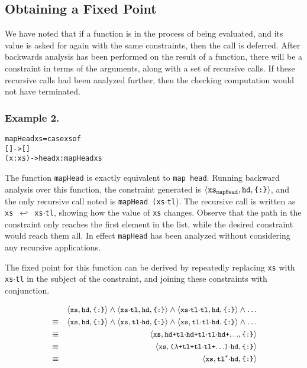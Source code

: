 \documentclass[book]{tfp05symp}
\newcommand{\T}[1]{\texttt{#1}}
\newcommand{\tup}[1]{\ensuremath{\langle #1 \rangle}}
\renewcommand{\c}[3]{\tup{\T{#1},\T{#2},\T{\{#3\}}}}
\newcommand{\s}[1]{\ensuremath{_{\tt #1}}}
\newcommand{\K}{\ensuremath{^\ast}}
\newcommand{\D}{\ensuremath{\cdot}}
\newcommand{\mapsfrom}{\hookleftarrow}
\newcounter{exmp}
\newcommand{\yesexample}{\subsubsection*{Example 2.\arabic{exmp}}\addtocounter{exmp}{1}}
\newenvironment{code}{\begin{alltt}\small}{\end{alltt}}
\begin{document}
\subsection{Obtaining a Fixed Point}
\label{sec:fixed_point}

We have noted that if a function is in the process of being
evaluated, and its value is asked for again with the same
constraints, then the call is deferred. After backwards analysis has
been performed on the result of a function, there will be a
constraint in terms of the arguments, along with a set of recursive
calls. If these recursive calls had been analyzed further, then the
checking computation would not have terminated.

\yesexample

\begin{code}
mapHead xs = case xs of
                  []     -> []
                  (x:xs) -> head x : mapHead xs
\end{code}

The function \T{mapHead} is exactly equivalent to \T{map head}.
Running backward analysis over this function, the constraint
generated is \c{xs\s{mapHead}}{hd}{:}, and the only recursive call
noted is \T{mapHead (xs\D{}tl}). The recursive call is written as
\T{xs $\mapsfrom$ xs\D{}tl}, showing how the value of \T{xs}
changes. Observe that the path in the constraint only reaches the
first element in the list, while the desired constraint would reach
them all. In effect \T{mapHead} has been analyzed without
considering any recursive applications.

The fixed point for this function can be derived by repeatedly
replacing \T{xs} with \T{xs\D{}tl} in the subject of the constraint,
and joining these constraints with conjunction.

\setcounter{equation}{0}
\renewcommand\theequation{\arabic{equation}}
\begin{eqnarray}
&& \small{\c{xs}{hd}{:} \wedge \c{xs\D{}tl}{hd}{:} \wedge
   \c{xs\D{}tl\D{}tl}{hd}{:} \wedge \ldots} \\
& \equiv & \small{\c{xs}{hd}{:} \wedge \c{xs}{tl\D{}hd}{:} \wedge
   \c{xs}{tl\D{}tl\D{}hd}{:} \wedge \ldots} \\
& \equiv & \small{\c{xs}{hd+tl\D{}hd+tl\D{}tl\D{}hd+$\ldots$}{:}} \\
& \equiv & \small{\c{xs}{($\lambda$+tl+tl\D{}tl+$\ldots$)\D{}hd}{:}} \\
& \equiv & \small{\c{xs}{tl\K\D{}hd}{:}}
\end{eqnarray}
\end{document}
